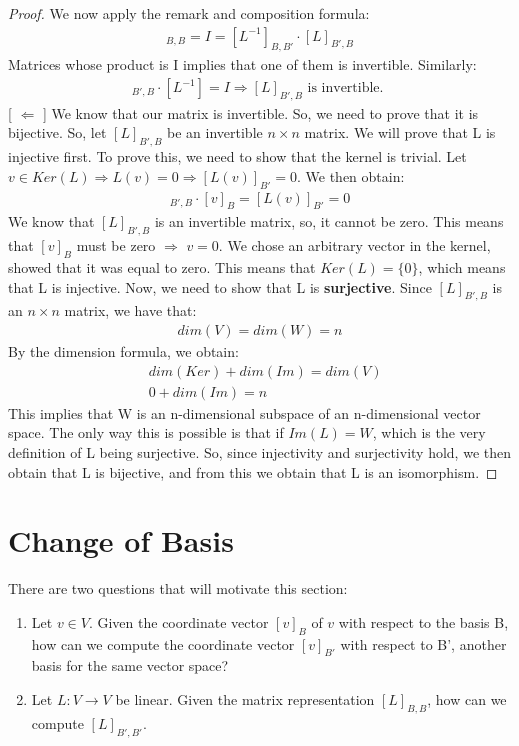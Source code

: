 \documentclass[a4paper, 12pt]{article}
\theoremstyle{definition}
\theoremstyle{definition}
\theoremstyle{definition}
\theoremstyle{definition}
\begin{document}
{\begin{proof}
\newline
\newline
We now apply the remark and composition formula:
\begin{align*}
	[L^{-1} \circ L]_{B,B} = I = [L^{-1}]_{B,B'} \cdot [L]_{B',B} 
\end{align*}
Matrices whose product is I implies that one of them is invertible. Similarly: 
\begin{align*}
	[L]_{B',B} \cdot [L^{-1}] = I \Rightarrow [L]_{B',B} \mbox{ is invertible. } 
\end{align*}
[ $\Leftarrow$ ] We know that our matrix is invertible. So, we need to prove that it is bijective. So, let $[L]_{B',B}$ be an invertible $n \times n$ matrix. We will prove that L is injective first. To prove this, we need to show that the kernel is trivial. 
\newline
\newline
Let $v \in Ker(L) \Rightarrow L(v) = 0 \Rightarrow [L(v)]_{B'} = 0$. We then obtain: 
\begin{align*}
	 [L]_{B', B} \cdot [v]_B = [L(v)]_{B'} = 0 
\end{align*}
We know that $[L]_{B',B}$ is an invertible matrix, so, it cannot be zero. This means that $[v]_B$ must be zero $\Rightarrow$ $v = 0$. We chose an arbitrary vector in the kernel, showed that it was equal to zero. This means that $Ker(L) = \{ 0 \}$, which means that L is injective. 
\newline
\newline
Now, we need to show that L is \textbf{surjective}. Since $[L]_{B',B}$ is an $n \times n$ matrix, we have that: 
\begin{align*}
	dim(V) = dim(W) = n 
\end{align*}
By the dimension formula, we obtain: 
\begin{align*}
	& dim(Ker) + dim(Im) = dim(V)  \\
	& 0 + dim(Im) = n 
\end{align*}
This implies that W is an n-dimensional subspace of an n-dimensional vector space. The only way this is possible is that if $Im(L) = W$, which is the very definition of L being surjective. So, since injectivity and surjectivity hold, we then obtain that L is bijective, and from this we obtain that L is an isomorphism. 
\end{proof}

\section{Change of Basis}
There are two questions that will motivate this section: 
\begin{enumerate}
	\item Let $v \in V$. Given the coordinate vector $[v]_B$ of $v$ with respect to the basis B, how can we compute the coordinate vector $[v]_{B'}$ with respect to B', another basis for the same vector space? 
	\item Let $L: V \rightarrow V$ be linear. Given the matrix representation $[L]_{B,B}$, how can we compute $[L]_{B',B'}$. 
\end{enumerate}
}
\end{document}
